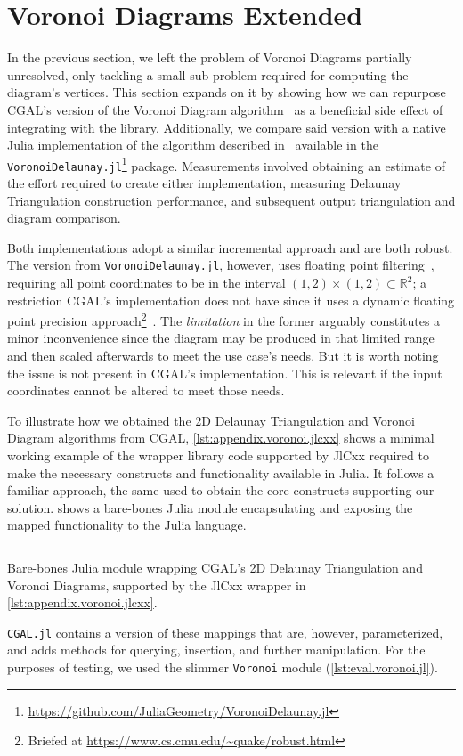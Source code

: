 \section{Voronoi Diagrams Extended}%
\label{sec:eval.voronoi}

In the previous section, we left the problem of Voronoi Diagrams partially
unresolved, only tackling a small sub-problem required for computing the
diagram's vertices.  This section expands on it by showing how we can repurpose
\ac{CGAL}'s version of the Voronoi Diagram algorithm~\cite{CGAL:5.3:VDA2} as a
beneficial side effect of integrating with the library.  Additionally, we
compare said version with a native Julia implementation of the algorithm
described in~\cite{Springel:2010:GCHSMM} available in the
\texttt{VoronoiDelaunay.jl}\footnote{\url{https://github.com/JuliaGeometry/VoronoiDelaunay.jl}}
package.  Measurements involved obtaining an estimate of the effort required to
create either implementation, measuring Delaunay Triangulation construction
performance, and subsequent output triangulation and diagram comparison.

Both implementations adopt a similar incremental approach and are both robust.
The version from \texttt{VoronoiDelaunay.jl}, however, uses floating point
filtering~\cite{Springel:2010:GCHSMM}, requiring all point coordinates to be in
the interval $\left(1, 2\right) \times \left(1, 2\right) \subset \mathbb{R}^2$;
a restriction \ac{CGAL}'s implementation does not have since it uses a dynamic
floating point precision approach\footnote{Briefed at
\url{https://www.cs.cmu.edu/~quake/robust.html}}~\cite{Shewchuk:1997:APFPAFRGP}.
The \textit{limitation} in the former arguably constitutes a minor inconvenience
since the diagram may be produced in that limited range and then scaled
afterwards to meet the use case's needs.  But it is worth noting the issue is
not present in \ac{CGAL}'s implementation.  This is relevant if the input
coordinates cannot be altered to meet those needs.

To illustrate how we obtained the 2D Delaunay Triangulation and Voronoi Diagram
algorithms from \ac{CGAL}, \cref{lst:appendix.voronoi.jlcxx} shows a minimal
working example of the wrapper library code supported by JlCxx required to make
the necessary constructs and functionality available in Julia.  It follows a
familiar approach, the same used to obtain the core constructs supporting our
\primitives{} solution.   shows a bare-bones Julia
module encapsulating and exposing the mapped functionality to the Julia
language.
\begin{listing}[htb]
  \inputminted{julia}{jl/Voronoi.jl}
  \caption[Bare-bones Julia module wrapping CGAL's Delaunay algorithms]{
    Bare-bones Julia module wrapping \ac{CGAL}'s 2D Delaunay Triangulation and
    Voronoi Diagrams, supported by the JlCxx wrapper in
    \cref{lst:appendix.voronoi.jlcxx}.}%
  \label{lst:eval.voronoi.jl}
\end{listing}
\texttt{CGAL.jl} contains a version of these mappings that are, however,
parameterized, and adds methods for querying, insertion, and further
manipulation.  For the purposes of testing, we used the slimmer \texttt{Voronoi}
module (\cref{lst:eval.voronoi.jl}).

